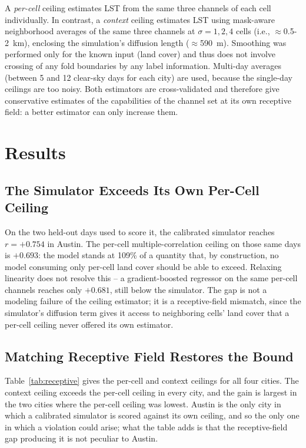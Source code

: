 A \emph{per-cell} ceiling estimates LST from the same three channels of each cell individually. In contrast, a \emph{context} ceiling estimates LST using mask-aware neighborhood averages of the same three channels at $\sigma=1,2,4$ cells (i.e., $\approx$0.5-2~km), enclosing the simulation's diffusion length ($\approx$590~m). Smoothing was performed only for the known input (land cover) and thus does not involve crossing of any fold boundaries by any label information. Multi-day averages (between 5 and 12 clear-sky days for each city) are used, because the single-day ceilings are too noisy. Both estimators are cross-validated and therefore give conservative estimates of the capabilities of the channel set at its own receptive field: a better estimator can only increase them.
\section{Results}

\subsection{The Simulator Exceeds Its Own Per-Cell Ceiling}

On the two held-out days used to score it, the calibrated simulator
reaches $r=+0.754$ in Austin. The per-cell multiple-correlation ceiling
on those same days is $+0.693$: the model stands at 109\% of a quantity
that, by construction, no model consuming only per-cell land cover should
be able to exceed. Relaxing linearity does not resolve this -- a
gradient-boosted regressor on the same per-cell channels reaches only
$+0.681$, still below the simulator. The gap is not a modeling failure of
the ceiling estimator; it is a receptive-field mismatch, since the
simulator's diffusion term gives it access to neighboring cells' land
cover that a per-cell ceiling never offered its own estimator.

\subsection{Matching Receptive Field Restores the Bound}

Table~\ref{tab:receptive} gives the per-cell and context ceilings for all
four cities. The context ceiling exceeds the per-cell ceiling in
every city, and the gain is largest in the two cities where the per-cell
ceiling was lowest. Austin is the only city in which a calibrated
simulator is scored against its own ceiling, and so the only one in which
a violation could arise; what the table adds is that the receptive-field
gap producing it is not peculiar to Austin.

